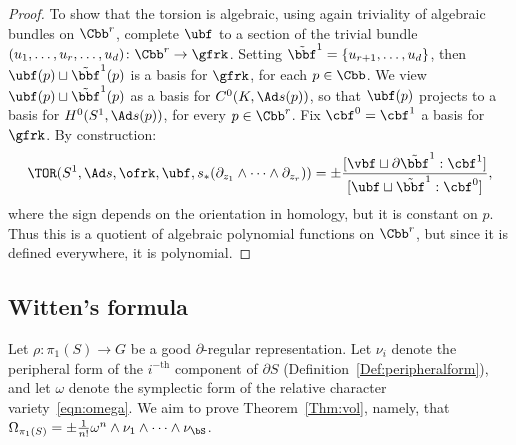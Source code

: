 \begin{proof}
To show that the torsion is algebraic, using again triviality of algebraic bundles on $\Cbb^r$, complete $\ubf$ to a section of the trivial bundle $(u_1,\dotsc,u_r,\dotsc, u_{d})\colon \Cbb^r \to\gfrk $. Setting $\tilde {\bbf}^1=\{u_{r+1},\dotsc,u_{d}\}$, then $\ubf(p)\sqcup \tilde {\bbf}^1(p)$ is a basis for $\gfrk$, for each $p\in \Cbb$. We view $\ubf(p)\sqcup \tilde {\bbf}^1(p)$ as a basis for $ C^0(K,\Ad s(p))$, so that $\ubf(p)$ projects to a basis for $H^0(S^1,\Ad s(p))$, for every $p\in\Cbb^r$. Fix $\cbf^0=\cbf^1$ a basis for $\gfrk$. By construction:
\[
\TOR(S^1,\Ad s, \ofrk, \ubf,s_*(\partial_{z_1}\wedge\dots\wedge \partial_{z_r})) =
\pm \frac {[\vbf \sqcup \partial \tilde {\bbf}^1 : \cbf^1]}{[\ubf \sqcup \tilde {\bbf}^1 : \cbf^0]},
\]
where the sign depends on the orientation in homology, but it is constant on $p$. Thus this is a quotient of algebraic polynomial functions on $\Cbb^r$, but since it is defined everywhere, it is polynomial.
\end{proof}



\subsection{Witten's formula}

Let $\rho\colon\pi_1(S)\to G$ be a good $\partial$-regular representation. Let $\nu_i$ denote the peripheral form of the $i^{-\text{th}}$ component of $\partial S$ (Definition~\ref{Def:peripheralform}), and let $\omega$ denote the symplectic form of the relative character variety~\eqref{eqn:omega}. We aim to prove Theorem~\ref{Thm:vol}, namely, that $
\Omega_{\pi_1(S)}=\pm \frac{1}{n!}\omega^{n}\wedge \nu_1\wedge\dots\wedge\nu_\bS $.



